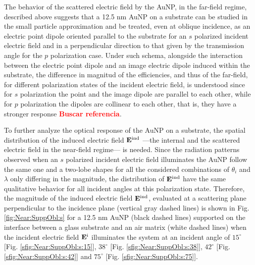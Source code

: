The behavior of the scattered electric field by the AuNP, in the far-field regime, described above suggests that a 12.5 nm AuNP on a substrate can be studied in the small particle approximation and be treated, even at oblique incidence, as an electric point dipole oriented  parallel to the substrate for an $s$ polarized incident electric field and in a perpendicular direction to that given by the transmission angle for the $p$ polarization case. Under such schema, alongside the interaction between the electric point dipole and an image electric dipole induced within the substrate, the difference in magnitud of the efficiencies, and thus of the far-field, for different polarization states of the incident electric field,  is understood since for $s$ polarization the point and the image dipole are parallel to each other, while for  $p$ polarization the dipoles are collinear to each other, that is, they have a stronger response \textcolor{red}{\bf Buscar referencia}.

To further analyze the optical response of the AuNP on a substrate, the spatial distribution of the induced electric field $\vb{E}^\text{ind}$ ---the internal and the scattered electric field in the near-field regime--- is needed. Since the radiation patterns observed when an $s$ polarized incident electric field illuminates the AuNP follow the same one and a two-lobe shapes for all the considered combinations of $\theta_i$ and $\lambda$ only differing in the magnitude, the distribution of $\vb{E}^\text{ind}$  have the same qualitative behavior for all incident angles at this polarization state. Therefore, the magnitude of the induced electric field $\vb{E}^\text{ind}$, evaluated at a scattering plane perpendicular to the incidence plane (vertical gray dashed lines) is shown in Fig. \ref{fig:Near:SuppObl:s} for a 12.5 nm AuNP (black dashed lines) supported on the interface between a glass substrate and an air matrix (white dashed lines) when the incident electric field $\vb{E}^\text{i}$ illuminates the system at an incident angle of $15^\circ$ [Fig. \ref{sfig:Near:SuppObl:s:15}], $38^\circ$ [Fig. \ref{sfig:Near:SuppObl:s:38}], $42^\circ$ [Fig. \ref{sfig:Near:SuppObl:s:42}]  and $75^\circ$ [Fig. \ref{sfig:Near:SuppObl:s:75}].

